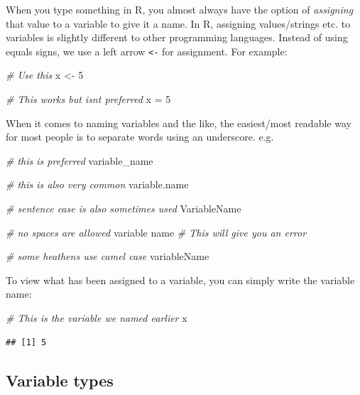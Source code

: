 \documentclass[
]{book}
\newenvironment{Shaded}{\begin{snugshade}}{\end{snugshade}}
\newcommand{\CommentTok}[1]{\textcolor[rgb]{0.56,0.35,0.01}{\textit{#1}}}
\newcommand{\DecValTok}[1]{\textcolor[rgb]{0.00,0.00,0.81}{#1}}
\newcommand{\NormalTok}[1]{#1}
\newcommand{\OtherTok}[1]{\textcolor[rgb]{0.56,0.35,0.01}{#1}}
\begin{document}
When you type something in R, you almost always have the option of \emph{assigning} that value to a variable to give it a name. In R, assigning values/strings etc. to variables is slightly different to other programming languages. Instead of using equals signs, we use a left arrow \texttt{\textless{}-} for assignment. For example:

\begin{Shaded}
\begin{Highlighting}[]
\CommentTok{\# Use this}
\NormalTok{x }\OtherTok{\textless{}{-}} \DecValTok{5}

\CommentTok{\# This works but isn\textquotesingle{}t preferred }
\NormalTok{x }\OtherTok{=} \DecValTok{5}
\end{Highlighting}
\end{Shaded}

When it comes to naming variables and the like, the easiest/most readable way for most people is to separate words using an underscore. e.g.

\begin{Shaded}
\begin{Highlighting}[]
\CommentTok{\# this is preferred}
\NormalTok{variable\_name}

\CommentTok{\# this is also very common}
\NormalTok{variable.name}

\CommentTok{\# sentence case is also sometimes used}
\NormalTok{VariableName}

\CommentTok{\# no spaces are allowed}
\NormalTok{variable name }\CommentTok{\# This will give you an error}

\CommentTok{\# some heathens use camel case}
\NormalTok{variableName}
\end{Highlighting}
\end{Shaded}

To view what has been assigned to a variable, you can simply write the variable name:

\begin{Shaded}
\begin{Highlighting}[]
\CommentTok{\# This is the variable we named earlier}
\NormalTok{x}
\end{Highlighting}
\end{Shaded}

\begin{verbatim}
## [1] 5
\end{verbatim}

\hypertarget{variable-types}{%
\subsection{Variable types}\label{variable-types}}
\end{document}
